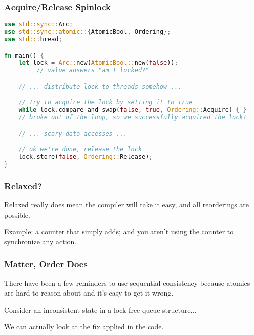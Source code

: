 \begin{frame}[fragile]
\frametitle{Acquire/Release Spinlock}

\begin{lstlisting}[language=Rust]
use std::sync::Arc;
use std::sync::atomic::{AtomicBool, Ordering};
use std::thread;

fn main() {
    let lock = Arc::new(AtomicBool::new(false));
         // value answers "am I locked?"

    // ... distribute lock to threads somehow ...

    // Try to acquire the lock by setting it to true
    while lock.compare_and_swap(false, true, Ordering::Acquire) { }
    // broke out of the loop, so we successfully acquired the lock!

    // ... scary data accesses ...

    // ok we're done, release the lock
    lock.store(false, Ordering::Release);
}
\end{lstlisting}


\end{frame}


\begin{frame}
\frametitle{Relaxed?}

Relaxed really does mean the compiler will take it easy, and all reorderings are possible.

Example: a counter that simply adds; and you aren't using the counter to synchronize any action.

\end{frame}


\begin{frame}
\frametitle{Matter, Order Does}

There have been a few reminders to use sequential consistency because atomics are hard to reason about and it's easy to get it wrong.

Consider an inconsistent state in a lock-free-queue structure...

We can actually look at the fix applied in the code.

\end{frame}




